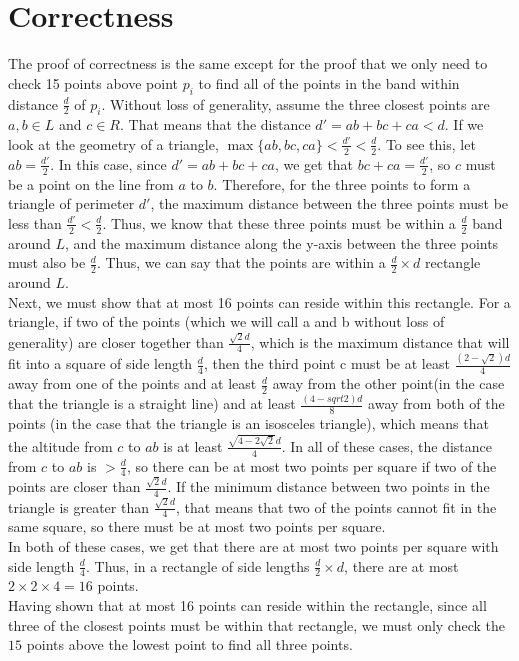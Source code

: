 \documentclass[12pt]{article}
\begin{document}
\section*{Correctness}
The proof of correctness is the same except for the proof that we only need to check 15 points above point $p_i$ to find all of the points in the band within distance $\frac{d}{2}$ of $p_i$. Without loss of generality, assume the three closest points are $a, b \in L$ and $c \in R$. That means that the distance $d' = ab + bc + ca < d$. If we look at the geometry of a triangle, $\max\{ab, bc, ca\} < \frac{d'}{2} < \frac{d}{2}$. To see this, let $ab = \frac{d'}{2}$. In this case, since $d' = ab + bc + ca$, we get that $bc + ca = \frac{d'}{2}$, so $c$ must be a point on the line from $a$ to $b$. Therefore, for the three points to form a triangle of perimeter $d'$, the maximum distance between the three points must be less than $\frac{d'}{2} < \frac{d}{2}$. Thus, we know that these three points must be within a $\frac{d}{2}$ band around $L$, and the maximum distance along the y-axis between the three points must also be $\frac{d}{2}$. Thus, we can say that the points are within a $\frac{d}{2} \times d$ rectangle around $L$. \\
Next, we must show that at most 16 points can reside within this rectangle. For a triangle, if two of the points (which we will call a and b without loss of generality) are closer together than $\frac{\sqrt{2}d}{4}$, which is the maximum distance that will fit into a square of side length $\frac{d}{4}$, then the third point c must be at least $\frac{(2 - \sqrt{2})d}{4}$ away from one of the points and at least $\frac{d}{2}$ away from the other point(in the case that the triangle is a straight line) and at least $\frac{(4 - sqrt{2})d}{8}$ away from both of the points (in the case that the triangle is an isosceles triangle), which means that the altitude from $c$ to $ab$ is at least $\frac{\sqrt{4 - 2\sqrt{2}}d}{4}$. In all of these cases, the distance from $c$ to $ab$ is $> \frac{d}{4}$, so there can be at most two points per square if two of the points are closer than $\frac{\sqrt{2}d}{4}$. If the minimum distance between two points in the triangle is greater than $\frac{\sqrt{2}d}{4}$, that means that two of the points cannot fit in the same square, so there must be at most two points per square. \\
In both of these cases, we get that there are at most two points per square with side length $\frac{d}{4}$. Thus, in a rectangle of side lengths $\frac{d}{2} \times d$, there are at most $2 \times 2 \times 4 = 16$ points. \\
Having shown that at most 16 points can reside within the rectangle, since all three of the closest points must be within that rectangle, we must only check the $15$ points above the lowest point to find all three points. 
\end{document}
